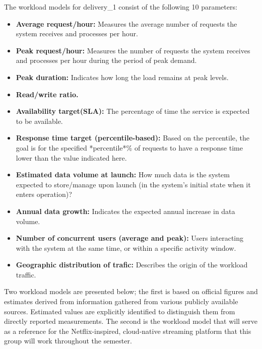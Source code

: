 \documentclass{article}
\begin{document}
The workload models for delivery\_1 consist of the following 10 parameters:
\begin{itemize}
    \item \textbf{Average request/hour:} Measures the average number of requests the system receives and processes per hour.
    \item \textbf{Peak request/hour:} Measures the number of requests the system receives and processes per hour during the period of peak demand.
    \item \textbf{Peak duration:} Indicates how long the load remains at peak levels.
    \item \textbf{Read/write ratio.}
    \item \textbf{Availability target(SLA):} The percentage of time the service is expected to be available.
    \item \textbf{Response time target (percentile-based):} Based on the percentile, the goal is for the specified *percentile*\% of requests to have a response time lower than the value indicated here.
    \item \textbf{Estimated data volume at launch:} How much data is the system expected to store/manage upon launch (in the system's initial state when it enters operation)?
    \item \textbf{Annual data growth:} Indicates the expected annual increase in data volume.
    \item \textbf{Number of concurrent users (average and peak):} Users interacting with the system at the same time, or within a specific activity window.
    \item \textbf{Geographic distribution of trafic:} Describes the origin of the workload traffic.
\end{itemize}


Two workload models are presented below; the first is based on official figures and estimates derived from information gathered from various publicly available sources. Estimated values are explicitly identified to distinguish them from directly reported measurements. The second is the workload model that will serve as a reference for the Netflix-inspired, cloud-native streaming platform that this group will work throughout the semester.
\end{document}
